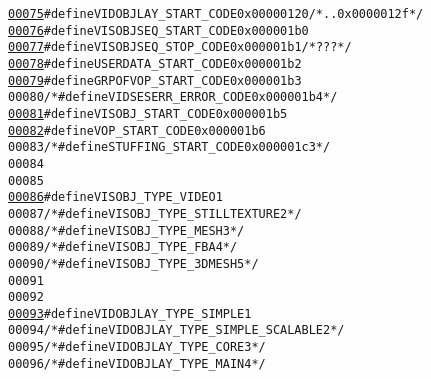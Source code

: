 \begin{footnotesize}
\begin{alltt}
\hypertarget{_bitstream_8h_source_l00075}{}\hyperlink{_bitstream_8h_a33dc5a33a62c92f4e041a83d796c3999}{00075} \textcolor{preprocessor}{#define VIDOBJLAY\_START\_CODE    0x00000120      }\textcolor{comment}{/* ..0x0000012f */}
\hypertarget{_bitstream_8h_source_l00076}{}\hyperlink{_bitstream_8h_a5550f5a4cd5ab35e866a5a94124b2ad6}{00076} \textcolor{preprocessor}{#define VISOBJSEQ\_START\_CODE    0x000001b0}
\hypertarget{_bitstream_8h_source_l00077}{}\hyperlink{_bitstream_8h_af1f5dd21b194b74dd067b15ba49c2c0c}{00077} \textcolor{preprocessor}{}\textcolor{preprocessor}{#define VISOBJSEQ\_STOP\_CODE             0x000001b1      }\textcolor{comment}{/* ??? */}
\hypertarget{_bitstream_8h_source_l00078}{}\hyperlink{_bitstream_8h_a1f5eb3933cb407baaad43527d029b837}{00078} \textcolor{preprocessor}{#define USERDATA\_START\_CODE             0x000001b2}
\hypertarget{_bitstream_8h_source_l00079}{}\hyperlink{_bitstream_8h_a3efc559c506c180fa10445439123972a}{00079} \textcolor{preprocessor}{}\textcolor{preprocessor}{#define GRPOFVOP\_START\_CODE             0x000001b3}
00080 \textcolor{preprocessor}{}\textcolor{comment}{/*#define VIDSESERR\_ERROR\_CODE  0x000001b4 */}
\hypertarget{_bitstream_8h_source_l00081}{}\hyperlink{_bitstream_8h_ac6756b1879e3f5778e33b3ffb2792a4c}{00081} \textcolor{preprocessor}{#define VISOBJ\_START\_CODE               0x000001b5}
\hypertarget{_bitstream_8h_source_l00082}{}\hyperlink{_bitstream_8h_a25dcf1a2c9a296ea3f643d7851f11c29}{00082} \textcolor{preprocessor}{}\textcolor{preprocessor}{#define VOP\_START\_CODE                  0x000001b6}
00083 \textcolor{preprocessor}{}\textcolor{comment}{/*#define STUFFING\_START\_CODE   0x000001c3 */}
00084 
00085 
\hypertarget{_bitstream_8h_source_l00086}{}\hyperlink{_bitstream_8h_a810c5baf4854f610e6d80752dc4691d1}{00086} \textcolor{preprocessor}{#define VISOBJ\_TYPE\_VIDEO                               1}
00087 \textcolor{preprocessor}{}\textcolor{comment}{/*#define VISOBJ\_TYPE\_STILLTEXTURE      2 */}
00088 \textcolor{comment}{/*#define VISOBJ\_TYPE\_MESH              3 */}
00089 \textcolor{comment}{/*#define VISOBJ\_TYPE\_FBA               4 */}
00090 \textcolor{comment}{/*#define VISOBJ\_TYPE\_3DMESH            5 */}
00091 
00092 
\hypertarget{_bitstream_8h_source_l00093}{}\hyperlink{_bitstream_8h_ac45db4c1cd965589aeba6704d0544ee7}{00093} \textcolor{preprocessor}{#define VIDOBJLAY\_TYPE\_SIMPLE                   1}
00094 \textcolor{preprocessor}{}\textcolor{comment}{/*#define VIDOBJLAY\_TYPE\_SIMPLE\_SCALABLE    2 */}
00095 \textcolor{comment}{/*#define VIDOBJLAY\_TYPE\_CORE                           3 */}
00096 \textcolor{comment}{/*#define VIDOBJLAY\_TYPE\_MAIN                           4 */}

\end{alltt}
\end{footnotesize}
